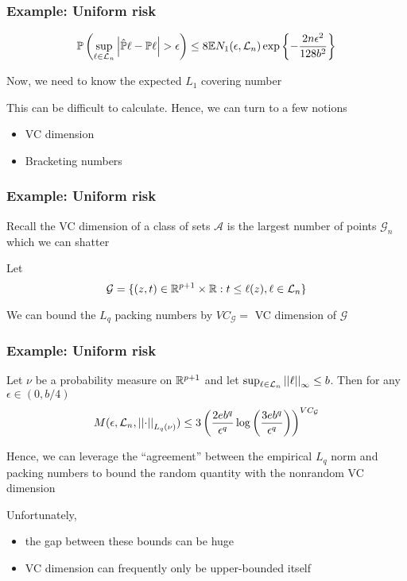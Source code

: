 \documentclass[12pt]{beamer}
\begin{document}
\begin{frame}[fragile]
\frametitle{Example: Uniform risk }
\[
\mathbb{P}\left(\sup_{\ell \in \mathcal{L}_n} \left|  \hat{\mathbb{P}}\ell - \mathbb{P}\ell \right| > \epsilon \right) 
\leq 
8\mathbb{E} N_1(\epsilon,\mathcal{L}_n) \exp\left\{- \frac{2n\epsilon^2}{128b^2} \right\}
\]

\vsp
Now, we need to know the expected $L_1$ covering number

\vsp
This can be difficult to calculate.  Hence, we can turn to a few notions
\begin{itemize}
\item VC dimension
\item Bracketing numbers
\end{itemize}
\end{frame}

\begin{frame}[fragile]
\frametitle{Example: Uniform risk }
Recall the VC dimension of a class of sets $\mathcal{A}$
is the largest number of points $\mathcal{G}_n$ which we can shatter

\vsp

Let 
\[
\mathcal{G} = \{ (z,t) \in \mathbb{R}^{p+1}\times\mathbb{R}: t \leq \ell(z), \ell \in \mathcal{L}_n\}
\]

\vsp
We can bound the $L_q$ packing numbers by $VC_{\mathcal{G}} =$  VC dimension of $\mathcal{G}$
\end{frame}

\begin{frame}[fragile]
\frametitle{Example: Uniform risk }
Let $\nu$ be a probability measure on $\mathbb{R}^{p+1}$ and let $\sup_{\ell \in \mathcal{L}_n} \left|\left| \ell \right|\right|_{\infty} \leq b$.  Then
for any $\epsilon \in (0,b/4)$
\[
M(\epsilon,\mathcal{L}_n,\left|\left| \cdot \right|\right|_{L_q(\nu)}) \leq 
3
\left(
\frac{2eb^q}{\epsilon^q}\log\left( \frac{3eb^q}{\epsilon^q}\right) 
\right)^{VC_{\mathcal{G}}}
\]

\vsp
Hence, we can leverage the ``agreement'' between the empirical $L_q$ norm and packing numbers to bound 
the random quantity with the nonrandom VC dimension

\vsp
Unfortunately, 
\begin{itemize}
\item the gap between these bounds can be huge
\item VC dimension can frequently only be upper-bounded itself
\end{itemize}
\end{frame}
\end{document}
